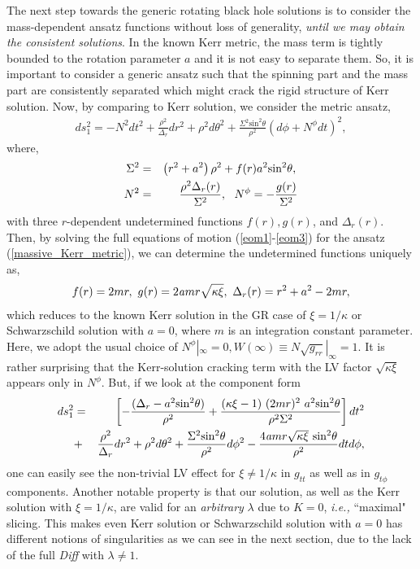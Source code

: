 \documentclass[preprint,aps,tightenlines,showkeys,nofootinbib,superscriptaddress]{revtex4}
\newcommand{\beq}{\begin{eqnarray}}
\newcommand{\eeq}{\end{eqnarray}}
\newcommand{\De}{\Delta}
\newcommand{\ka}{\kappa}
\newcommand{\la}{{\lambda}}
\newcommand{\Si}{{\Sigma}}
\newcommand{\no}{{\nonumber}}
\newcommand{\f}{\frac}
\begin{document}
The next step towards the generic rotating black hole solutions is to consider the mass-dependent ansatz functions without loss of generality, {\it until we may obtain the consistent solutions}. In the known Kerr metric, the mass term is tightly bounded to the rotation parameter $a$ and it is not easy to separate them. So, it is important to consider a generic ansatz such that the spinning part and the mass part are consistently separated which might crack the rigid structure of Kerr solution. Now, by comparing to Kerr solution, we consider the metric ansatz,
\beq
ds^2_{1}=-N^2 dt^2+\frac{\rho^2}{ \Delta_r}dr^2+ \rho^2 d \theta^2
+\frac{ \Sigma^2 \mbox{sin}^2\theta}{\rho^2} \left(d \phi +N^{\phi} dt \right)^2,
\label{massive_Kerr_metric}
\eeq
where,
\beq
\Sigma^2&=& \left( r^2 + a^2 \right) \rho^2 +f(r) a^2 \mbox{sin}^2\theta, \no \\
N^2&=&\frac{\rho^2 \Delta_r (r) }{ \Sigma^2},~~ %
N^{\phi}=-\f{g(r)}{\Sigma^2}
\label{massive_Kerr_functions}
\eeq
with three $r$-dependent undetermined functions $f(r), g(r)$, and $\Delta_r (r)$. Then, by solving the full equations of motion (\ref{eom1}-\ref{eom3}) for the ansatz (\ref{massive_Kerr_metric}), we can determine the undetermined functions uniquely as,
\beq
f(r)=2m r, ~g(r)=2 {\it a} mr \sqrt{\kappa \xi}, ~\Delta_r (r)=r^2+a^2-2mr,
\label{f,g_sol}
\eeq
which reduces to the known Kerr solution in the GR case of $\xi=1/\ka$ or Schwarzschild solution with $a=0$, where $m$ is an integration constant parameter. Here, we adopt the usual choice of $N^{\phi}|_{\infty}=0, W(\infty) \equiv N \sqrt{g_{rr}}|_{\infty}=1$. It is rather surprising that the Kerr-solution cracking term with the LV factor $\sqrt{\kappa \xi}$ appears only in $N^{\phi}$. But, if we look at the component form
\beq
ds^2_{1}&=&\left[ -\f{(\De_r-a^2 \mbox{sin}^2\theta )}{\rho^2}+\f{(\ka \xi-1)~(2mr)^2~ a^2 \mbox{sin}^2\theta }{\rho^2 \Si^2}\right] dt^2 \no \\
&+&\frac{\rho^2}{ \Delta_r}dr^2+ \rho^2 d \theta^2
+\frac{ \Sigma^2 \mbox{sin}^2\theta}{\rho^2} d \phi ^2-\f{4 {\it a} mr \sqrt{\ka \xi}~ \mbox{sin}^2\theta}{ \rho^2} dt d\phi,
\label{massive_Kerr_metric_comp}
\eeq
one can easily see the non-trivial LV
effect for $\xi \neq 1/\ka$
in $g_{tt}$ as well as in $g_{t \phi}$ components. Another notable property is that our
solution, as well as the Kerr solution with $\xi = 1/\ka$, are valid for
an {\it arbitrary} $\la$ due to $K=0$, {\it i.e.,} ``maximal"
slicing. This makes even Kerr solution or Schwarzschild solution with $a=0$ has different notions of singularities as we can see in the next section, due to the lack of the full {\it Diff} with $\la \neq 1$.
\end{document}
